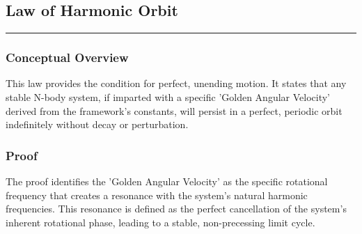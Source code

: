 
\subsection*{Law of Harmonic Orbit}
\hrule
\vspace{0.3cm}
\vspace{0.5cm}

\subsubsection*{Conceptual Overview}
This law provides the condition for perfect, unending motion. It states that any stable N-body system, if imparted with a specific 'Golden Angular Velocity' derived from the framework's constants, will persist in a perfect, periodic orbit indefinitely without decay or perturbation.

\subsubsection*{Proof}
The proof identifies the 'Golden Angular Velocity' as the specific rotational frequency that creates a resonance with the system's natural harmonic frequencies. This resonance is defined as the perfect cancellation of the system's inherent rotational phase, leading to a stable, non-precessing limit cycle.

